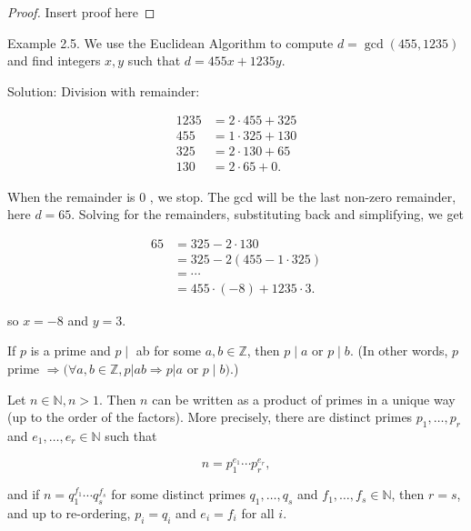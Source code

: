 \begin{proof}
  Insert proof here
\end{proof}

\begin{example}
  
Example 2.5. We use the Euclidean Algorithm to compute \(d=\operatorname{gcd}(455,1235)\) and find integers \(x, y\) such that \(d=455 x+1235 y\).

Solution: Division with remainder:

\[
\begin{aligned}
1235 & =2 \cdot 455+325 \\
455 & =1 \cdot 325+130 \\
325 & =2 \cdot 130+65 \\
130 & =2 \cdot 65+0 .
\end{aligned}
\]

When the remainder is 0 , we stop. The gcd will be the last non-zero remainder, here \(d=65\). Solving for the remainders, substituting back and simplifying, we get

\[
\begin{aligned}
65 & =325-2 \cdot 130 \\
& =325-2(455-1 \cdot 325) \\
& =\cdots \\
& =455 \cdot(-8)+1235 \cdot 3 .
\end{aligned}
\]

so \(x=-8\) and \(y=3\).

\end{example}

\begin{lemma}
  If \(p\) is a prime and \(p \mid\) ab for some \(a, b \in \mathbb{Z}\), then \(p \mid a\) or \(p \mid b\). (In other words, \(p\) prime \(\Rightarrow(\forall a, b \in \mathbb{Z}, p|a b \Rightarrow p| a\) or \(p \mid b)\).)
\end{lemma}

\begin{theorem}
Let \(n \in \mathbb{N}, n>1\). Then \(n\) can be written as a product of primes in a unique way (up to the order of the factors). More precisely, there are distinct primes \(p_1, \ldots, p_r\) and \(e_1, \ldots, e_r \in \mathbb{N}\) such that

\[
n=p_1^{e_1} \cdots p_r^{e_r},
\]

and if \(n=q_1^{f_1} \cdots q_s^{f_s}\) for some distinct primes \(q_1, \ldots, q_s\) and \(f_1, \ldots, f_s \in \mathbb{N}\), then \(r=s\), and up to re-ordering, \(p_i=q_i\) and \(e_i=f_i\) for all \(i\).
\end{theorem}


